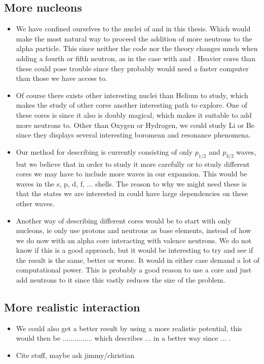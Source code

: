 \documentclass[../main/report.tex]{subfiles}
\begin{document}
\subsection{More nucleons}
  \begin{itemize}
    \item We have confined ourselves to the nuclei of  and  in this thesis.
    Which would make the most natural way to proceed the addition of more neutrons to the alpha particle.
    This since neither the code nor the theory changes much when adding a fourth or fifth neutron, as in the case with  and .
    Heavier cores than these could pose trouble since they probably would need a faster computer than those we have access to.

   \item Of course there exists other interesting nuclei than Helium to study, which makes the study of other cores another interesting path to explore.
   One of these cores is  since it also is doubly magical, which makes it suitable to add more neutrons to.
   Other than Oxygen or Hydrogen, we could study Li or Be since they displays several interesting boromean and resonance phenomena.

   \item Our method for describing  is currently consisting of only $p_{1/2}$ and $p_{3/2}$ waves, but we believe that in order to study it more carefully or to study different cores we may have to include more waves in our expansion.
   This would be waves in the s, p, d, f, ... shells.
   The reason to why we might need these is that the states we are interested in could have large dependencies on these other waves.

   \item Another way of describing different cores would be to start with only nucleons, ie only use protons and neutrons as base elements, instead of how we do now with an alpha core interacting with valence neutrons.
   We do not know if this is a good approach, but it would be interesting to try and see if the result is the same, better or worse.
   It would in either case demand a lot of computational power.
   This is probably a good reason to use a core and just add neutrons to it since this vastly reduces the size of the problem.
  \end{itemize}

\subsection{More realistic interaction}
  \begin{itemize}
   \item We could also get a better result by using a more realistic potential, this would then be ............... which describes ... in a better way since ... .
    \item Cite stuff, maybe ask jimmy/christian
  \end{itemize}
\end{document}
